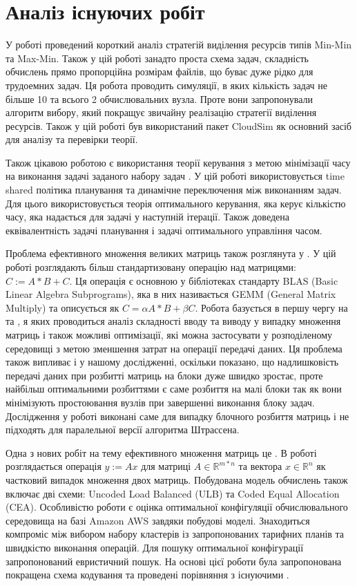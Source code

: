 \section{Аналіз існуючих робіт}

У роботі \cite{AppSelAlgoFEffResProvInCloud} проведений короткий аналіз стратегій виділення ресурсів типів Min-Min та Max-Min. Також у цій роботі занадто проста схема задач, складність обчислень прямо пропорційна розмірам файлів, що буває дуже рідко для трудоемних задач. Ця робота проводить симуляції, в яких кількість задач не більше 10 та всього 2 обчислювальних вузла. Проте вони запропонували алгоритм вибору, який покращує звичайну реалізацію стратегії виділення ресурсів. Також у цій роботі був використаний пакет CloudSim як основний засіб для аналізу та перевірки теорії.

Також цікавою роботою є використання теорії керування з метою мінімізації часу на виконання задачі заданого набору задач \cite{Prasanna1991GeneralisedMS}. У цій роботі використовується time shared політика планування та динамічне переключення між виконанням задач. Для цього використовується теорія оптимального керування, яка керує кількістю часу, яка надається для задачі у наступній ітерації. Також доведена еквівалентність задачі планування і задачі оптимального управління часом.

Проблема ефективного множення великих матриць також розглянута у \cite{PushingTheBoundsOfMatrixMatrix}. У цій роботі розглядають більш стандартизовану операцію над матрицями: $C := A*B + C$. Ця операція є основною у бібліотеках стандарту BLAS (Basic Linear Algebra Subprograms), яка в них називається GEMM (General Matrix Multiply) та описується як $C = \alpha A*B + \beta C$. Робота базується в першу чергу на \cite{IOComplexityMatrixMatrix} та \cite{Irony}, я яких проводиться аналіз складності вводу та виводу у випадку множення матриць і також можливі оптимізації, які можна застосувати у розподіленому середовищі з метою зменшення затрат на операції передачі даних. Ця проблема також випливає і у нашому дослідженні, оскільки показано, що надлишковість передачі даних при розбитті матриць на блоки дуже швидко зростає, проте найбільш оптимальними розбиттями є саме розбиття на малі блоки так як вони мінімізують простоювання вузлів при завершенні виконання блоку задач. Дослідження у роботі виконані саме для випадку блочного розбиття матриць і не підходять для паралельної версії алгоритма Штрассена.

Одна з нових робіт на тему ефективного множення матриць це \cite{CodedHeterogeneousMatrixMatrix}. В роботі розглядається операція $y:=Ax$ для матриці $A \in \mathbb{R}^{m*n}$ та вектора $x \in \mathbb{R}^{n}$ як частковий випадок множення двох матриць. Побудована модель обчислень також включає дві схеми: Uncoded Load Balanced (ULB) та Coded Equal Allocation (CEA). Особливістю роботи є оцінка оптимальної конфігуляції обчислювального середовища на базі Amazon AWS завдяки побудові моделі. Знаходиться компроміс між вибором набору кластерів із запропонованих тарифних планів та швидкістю виконання операцій. Для пошуку оптимальної конфігурації запропонований евристичний пошук. На основі цієї роботи була запропонована покращена схема кодування та проведені порівняння з існуючими \cite{CodedHeterogeneousMatrixMatrix2}.


